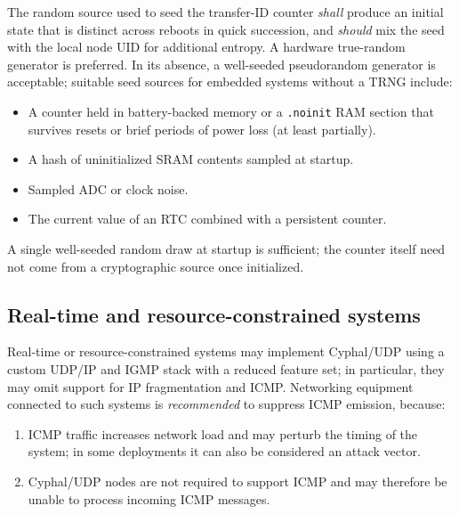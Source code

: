The random source used to seed the transfer-ID counter \emph{shall} produce an initial state that is
distinct across reboots in quick succession, and \emph{should} mix the seed with the local node UID for
additional entropy.
A hardware true-random generator is preferred.
In its absence, a well-seeded pseudorandom generator is acceptable; suitable seed sources for embedded
systems without a TRNG include:

\begin{itemize}
    \item A counter held in battery-backed memory or a \texttt{.noinit} RAM section that survives resets
    or brief periods of power loss (at least partially).
    \item A hash of uninitialized SRAM contents sampled at startup.
    \item Sampled ADC or clock noise.
    \item The current value of an RTC combined with a persistent counter.
\end{itemize}

A single well-seeded random draw at startup is sufficient; the counter itself need not come from a
cryptographic source once initialized.

\subsection{Real-time and resource-constrained systems}

Real-time or resource-constrained systems may implement Cyphal/UDP using a custom UDP/IP and IGMP stack
with a reduced feature set; in particular, they may omit support for IP fragmentation and ICMP.
Networking equipment connected to such systems is \emph{recommended} to suppress ICMP emission, because:

\begin{enumerate}
    \item ICMP traffic increases network load and may perturb the timing of the system; in some
    deployments it can also be considered an attack vector.
    \item Cyphal/UDP nodes are not required to support ICMP and may therefore be unable to process
    incoming ICMP messages.
\end{enumerate}
